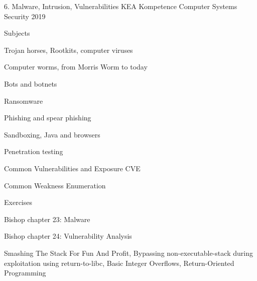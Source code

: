 \documentclass[Screen16to9,17pt]{foils}
\begin{document}
\mytitlepage
{6. Malware, Intrusion, Vulnerabilities}
{KEA Kompetence Computer Systems Security 2019}



\begin{list1}
\item Subjects
\begin{list2}
  \item Trojan horses, Rootkits, computer viruses
  \item Computer worms, from Morris Worm to today
  \item Bots and botnets
  \item Ransomware
  \item Phishing and spear phishing
  \item Sandboxing, Java and browsers
  \item Penetration testing
  \item Common Vulnerabilities and Exposure CVE
  \item Common Weakness Enumeration
\end{list2}
\item Exercises
\begin{list2}
\item
\item
\end{list2}
\end{list1}




\begin{list1}
\item Bishop chapter 23: Malware
\item Bishop chapter 24: Vulnerability Analysis
\item Smashing The Stack For Fun And Profit, Bypassing non-executable-stack during exploitation using return-to-libc, Basic Integer Overflows, Return-Oriented Programming

\end{list1}























\slidenext
\end{document}
